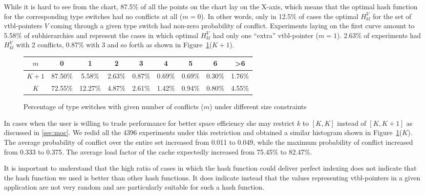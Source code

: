 While it is hard to see from the chart, 87.5\% of all the points on the chart 
lay on the X-axis, which means that the optimal hash function for the 
corresponding type switches had no conflicts at all ($m=0$). In other words, only in 12.5\% 
of cases the optimal $H_{kl}^V$ for the set of vtbl-pointers $V$ coming through 
a given type switch had non-zero probability of conflict. Experiments laying on 
the first curve amount to 5.58\% of subhierarchies and represent the cases in 
which optimal $H_{kl}^V$ had only one ``extra'' vtbl-pointer ($m=1$). 2.63\% of 
experiments had $H_{kl}^V$ with 2 conflicts, 0.87\% with 3 and so forth as shown 
in Figure~\ref{fig:size}($K+1$).

\begin{figure}[htbp]
\small
\begin{tabular}
{@{}c@{}||@{}c@{ }|@{}c@{ }|@{}c@{ }|@{}c@{ }|@{}c@{ }|@{}c@{ }|@{}c@{ }|@{}c@{ }}
\hline %
  $m$ &       0 &       1 &      2 &      3 &      4 &        5 &      6 & \textgreater 6 \\
\hline %
$K+1$ & 87.50\% &  5.58\% & 2.63\% & 0.87\% & 0.69\% & 0.69\% & 0.30\% & 1.76\% \\
\hline %
  $K$ & 72.55\% & 12.27\% & 4.87\% & 2.61\% & 1.42\% & 0.94\% & 0.80\% & 4.55\% 
\end{tabular}
\caption{Percentage of type switches with given number of conflicts ($m$) under different size constraints}
\label{fig:size}
\end{figure}

\noindent
In cases when the user is willing to trade performance for better space 
efficiency she may restrict $k$ to $[K,K]$ instead of $[K,K+1]$ as discussed in 
\textsection\ref{sec:moc}. We redid all the 4396 experiments under this 
restriction and obtained a similar histogram shown in Figure~\ref{fig:size}($K$).
The average probability of conflict over the entire set increased from 0.011 to 
0.049, while the maximum probability of conflict increased from 0.333 to 0.375. 
The average load factor of the cache expectedly increased from 75.45\% to 82.47\%. 

It is important to understand that the high ratio of cases in which the hash 
function could deliver perfect indexing does not indicate that the hash function 
we used is better than other hash functions. It does indicate instead that the 
values representing vtbl-pointers in a given application are not very random and 
are particularly suitable for such a hash function.

